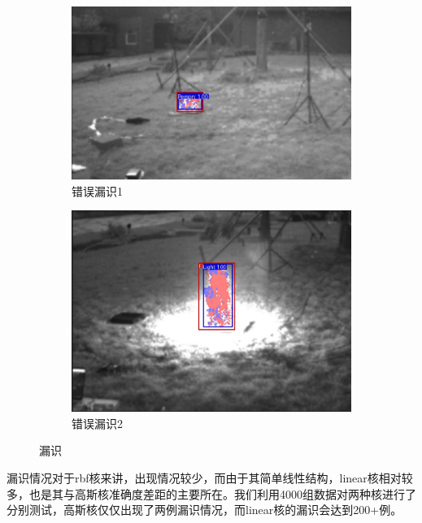 \begin{figure}[ht]
    \centering
    \begin{subfigure}{0.49\textwidth}
        \centering
        \includegraphics[width=\textwidth]{figures/jiance3.png}
        \caption{错误漏识1}
        \label{21.a}
    \end{subfigure}
    \hfill
    \begin{subfigure}{0.49\textwidth}
        \centering
        \includegraphics[width=\textwidth]{figures/jiance7.png}
        \caption{错误漏识2}
        \label{21.b}
    \end{subfigure}
    \caption{漏识}
    \label{21}
\end{figure}

漏识情况对于rbf核来讲，出现情况较少，而由于其简单线性结构，linear核相对较多，也是其与高斯核准确度差距的主要所在。我们利用4000组数据对两种核进行了分别测试，高斯核仅仅出现了两例漏识情况，而linear核的漏识会达到200+例。

